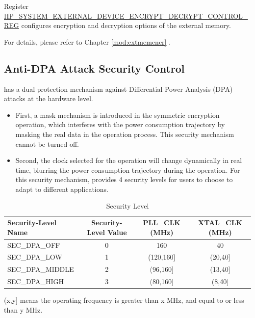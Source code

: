 \documentclass[main\_\_EN.tex]{subfiles}
\begin{document}
Register \hyperref[regdesc:HPSYSTEMEXTERNALDEVICEENCRYPTDECRYPTCONTROLREG]{HP\_SYSTEM\_EXTERNAL\_DEVICE\_ENCRYPT\_DECRYPT\_CONTROL\_REG} configures encryption and decryption options of the external memory.

For details, please refer to Chapter \ref{mod:extmemencr}
\textit{}.

\subsection{Anti-DPA Attack Security Control}
\label{sec:sysreg-anti-dpa-attack-security-control}

\chipname{} has a dual protection mechanism against Differential Power Analysis (DPA) attacks at the hardware level.

\begin{itemize}
    \item First, a mask mechanism is introduced in the symmetric encryption operation, which interferes with the power consumption trajectory by masking the real data in the operation process. This security mechanism cannot be turned off.
    \item Second, the clock selected for the operation will change dynamically in real time, blurring the power consumption trajectory during the operation. For this security mechanism, \chipname{} provides 4 security levels for users to choose to adapt to different applications.
\end{itemize}

\begin{table}[H]
    \centering
    \caption{Security Level}
    \label{tab:sysreg-security-level}
    \begin{threeparttable}
    \begin{tabular}[c]{| l | c | c | c |}
    \hline
    \rowcolor{lightgray}
        \textbf{Security-Level Name} & \textbf{Security-Level Value} & \textbf{PLL\_CLK (MHz)} & \textbf{XTAL\_CLK (MHz)} \\ \hline
        SEC\_DPA\_OFF       & 0    & 160           & 40          \\\hline
        SEC\_DPA\_LOW       & 1    & (120,160]\tnote{A}   & (20,40]\tnote{A}   \\\hline
        SEC\_DPA\_MIDDLE    & 2    & (96,160]\tnote{A}    & (13,40]\tnote{A} \\\hline
        SEC\_DPA\_HIGH      & 3    & (80,160]\tnote{A}    & (8,40]\tnote{A}   \\\hline
    \end{tabular}
    \begin{tablenotes}
        \item[A] (x,y] means the operating frequency is greater than x MHz, and equal to or less than y MHz.
    \end{tablenotes}
    \end{threeparttable}
\end{table}
\end{document}
